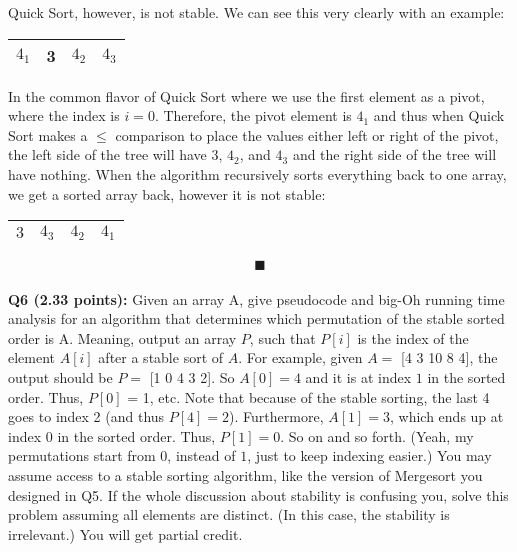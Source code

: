 \documentclass[a4paper,12pt]{article}
\begin{document}
Quick Sort, however, is not stable. We can see this very clearly with an example:\\

\begin{center}
    \begin{tabular}{| l | l | l | l |}
    \hline
    $4_1$ & 3 & $4_2$ & $4_3$ \\ \hline
    \end{tabular}
\end{center}

In the common flavor of Quick Sort where we use the first element as a pivot, where the index is $i=0$. Therefore, the pivot element is $4_1$ and thus when Quick Sort makes a $\leq$ comparison to place the values either left or right of the pivot, the left side of the tree will have $3$, $4_2$, and $4_3$ and the right side of the tree will have nothing. When the algorithm recursively sorts everything back to one array, we get a sorted array back, however it is not stable:\\

\begin{center}
    \begin{tabular}{| l | l | l | l |}
    \hline
    $3$ & $4_3$ & $4_2$ & $4_1$ \\ \hline
    \end{tabular}
\end{center}

$$\blacksquare$$\\

\textbf{Q6 (2.33 points):} Given an array A, give pseudocode and big-Oh running time analysis for an algorithm that determines which permutation of the stable sorted order is A. Meaning, output an array $P$, such that $P[i]$ is the index of the element $A[i]$ after a stable sort of $A$.
For example, given $A =$ [4 3 10 8 4], the output should be $P =$ [1 0 4 3 2]. So $A[0] = 4$ and it is at index $1$ in the sorted order. Thus, $P[0]$ = 1, etc. Note that because of the stable sorting, the last 4 goes to index 2 (and thus $P[4] = 2$). Furthermore, $A[1] = 3$, which ends up at index $0$ in the sorted order. Thus, $P[1] = 0$. So on and so forth. (Yeah, my permutations start from $0$, instead of $1$, just to keep indexing easier.) 
You may assume access to a stable sorting algorithm, like the version of Mergesort you designed in Q5. If the whole discussion about stability is confusing you, solve this problem assuming all elements are distinct. (In this case, the stability is irrelevant.) You will get partial credit.\\
\end{document}
